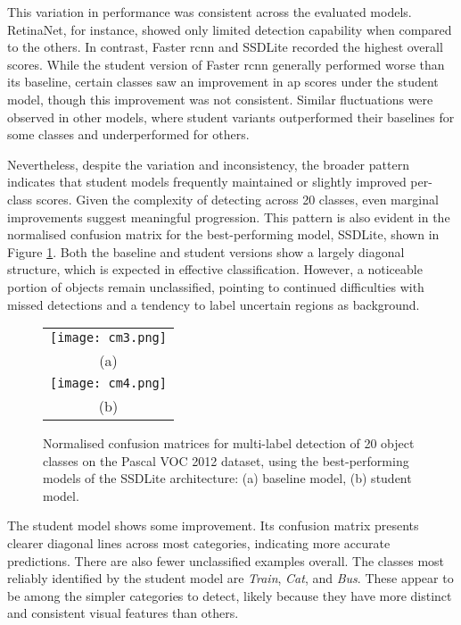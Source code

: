 This variation in performance was consistent across the evaluated models. RetinaNet, for instance, showed only limited detection capability when compared to the others. In contrast, Faster \gls{rcnn} and SSDLite recorded the highest overall scores. While the student version of Faster \gls{rcnn} generally performed worse than its baseline, certain classes saw an improvement in \gls{ap} scores under the student model, though this improvement was not consistent. Similar fluctuations were observed in other models, where student variants outperformed their baselines for some classes and underperformed for others.

Nevertheless, despite the variation and inconsistency, the broader pattern indicates that student models frequently maintained or slightly improved per-class scores. Given the complexity of detecting across 20 classes, even marginal improvements suggest meaningful progression.
This pattern is also evident in the normalised confusion matrix for the best-performing model, SSDLite, shown in Figure \ref{fig:cm_pascal_voc}. Both the baseline and student versions show a largely diagonal structure, which is expected in effective classification. However, a noticeable portion of objects remain unclassified, pointing to continued difficulties with missed detections and a tendency to label uncertain regions as background.

\begin{figure}[!ht]
  \centering
  \begin{tabular}{c}
    \texttt{[image: cm3.png]} \\
    \small (a) \\
    \addlinespace[1em]
    \texttt{[image: cm4.png]} \\
     \small (b) \\
  \end{tabular}
  \caption{Normalised confusion matrices for multi-label detection of 20 object classes on the Pascal VOC 2012 dataset, using the best-performing models of the SSDLite architecture: (a) baseline model, (b) student model.}
  \label{fig:cm_pascal_voc}
\end{figure}

The student model shows some improvement. Its confusion matrix presents clearer diagonal lines across most categories, indicating more accurate predictions. There are also fewer unclassified examples overall. The classes most reliably identified by the student model are \textit{Train}, \textit{Cat}, and \textit{Bus}. These appear to be among the simpler categories to detect, likely because they have more distinct and consistent visual features than others.

